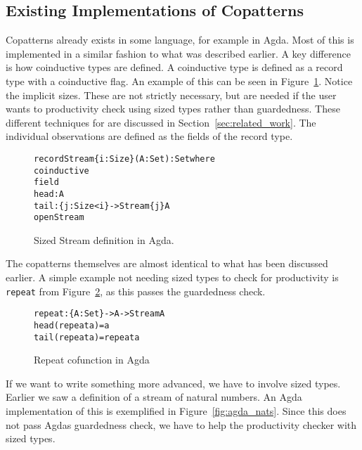


\subsection{Existing Implementations of Copatterns}
Copatterns already exists in some language, for example in Agda. Most of this is implemented in a similar fashion to what was described earlier. A key difference is how coinductive types are defined. A coinductive type is defined as a record type with a coinductive flag. An example of this can be seen in Figure~\ref{fig:agda_stream}. Notice the implicit sizes. These are not strictly necessary, but are needed if the user wants to productivity check using sized types rather than guardedness. These different techniques for are discussed in Section~\ref{sec:related_work}. The individual observations are defined as the fields of the record type.

\begin{figure}
\begin{alltt}
record Stream \{i : Size\} (A : Set) : Set where
  coinductive
  field
    head : A
    tail : \{j : Size< i\} ->  Stream \{j\} A
open Stream
\end{alltt}
\caption{Sized Stream definition in Agda.}
\label{fig:agda_stream}
\end{figure}

The copatterns themselves are almost identical to what has been discussed earlier. A simple example not needing sized types to check for productivity is \texttt{repeat} from Figure~\ref{fig:agda_repeat}, as this passes the guardedness check.

\begin{figure}
\begin{alltt}
repeat : \{A : Set\} -> A -> Stream A
head (repeat a) = a
tail (repeat a) = repeat a 
\end{alltt}
\caption{Repeat cofunction in Agda}
\label{fig:agda_repeat}
\end{figure}

If we want to write something more advanced, we have to involve sized types. Earlier we saw a definition of a stream of natural numbers. An Agda implementation of this is exemplified in Figure~\ref{fig:agda_nats}. Since this does not pass Agdas guardedness check, we have to help the productivity checker with sized types.

